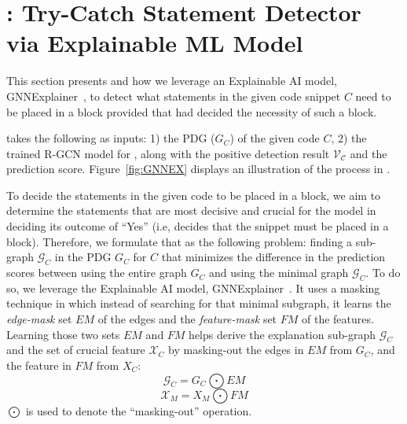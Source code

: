 \section{{\xstate}: Try-Catch Statement Detector via Explainable ML Model}
\label{interpretation:sec}

This section presents {\xstate} and how we leverage an Explainable AI
model, GNNExplainer~\cite{GNNExplainer}, to detect what statements in
the given code snippet $C$ need to be placed in a  block
provided that {\xblock} had decided the necessity of such a block.

{\xstate} takes the following as inputs: 1) the PDG ($G_C$) of the
given code $C$, 2) the trained R-GCN model for {\xblock}, along with
the positive detection result $\mathcal{V_C}$ and the prediction score.
Figure~\ref{fig:GNNEX} displays an illustration of the process in
{\xstate}.






To decide the statements in the given code to be placed in a
 block, we aim to determine the statements that are
most decisive and crucial for the {\xblock} model in deciding its
outcome of ``Yes'' (i.e, {\xblock} decides that the snippet must be
placed in a  block). Therefore, we formulate that as
the following problem: finding a sub-graph $\mathcal{G}_C$ in the PDG
$G_C$ for $C$ that minimizes the difference in the prediction scores
between using the entire graph $G_C$ and using the minimal graph
$\mathcal{G}_C$. To do so, we leverage the Explainable AI model,
GNNExplainer~\cite{GNNExplainer}. It uses a masking technique in which
instead of searching for that minimal subgraph, it learns the {\em
  edge-mask} set $EM$ of the edges and the {\em feature-mask} set $FM$
of the features. Learning those two sets $EM$ and $FM$ helps derive
the explanation sub-graph $\mathcal{G}_C$ and the set of crucial
feature $\mathcal{X}_C$ by masking-out the edges in $EM$ from $G_C$,
and the feature in $FM$ from $X_C$:
\begin{equation}\label{eq:11}
\mathcal{G}_C = G_C \bigodot EM
\end{equation}
\begin{equation}\label{eq:12}
\mathcal{X}_M = X_M \bigodot FM
\end{equation}
$\bigodot$ is used to denote the ``masking-out'' operation.

